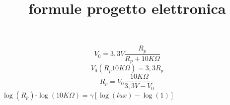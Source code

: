 \documentclass{article}
\title{formule progetto elettronica}
\begin{document}
	
	\[V_0=3,3V\frac{R_p}{R_p+10K\Omega}\]	\[V_0(R_p10K\Omega)=3,3R_p\]
	\[R_p=V_0\frac{10K\Omega}{3,3V-V_0}\]
	$\log(R_p)$-$\log(10K\Omega)=\gamma[\log(lux)-\log(1)]$
	
\end{document}
